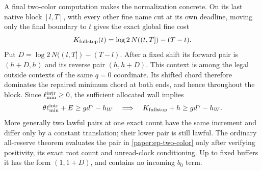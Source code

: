 A final two-color computation makes the normalization concrete.
On its last native block $[l,T]$, with every other fine name cut at
its own deadline, moving only the final boundary to $t$ gives the
exact global fine cost
\begin{equation}\label{paper:ep-two-color}
 K_{\rm fullstop}(t)=\log2\,N((t,T])-(T-t).
\end{equation}
Put $D=\log2\,N((l,T])-(T-l)$.  After a fixed shift its forward
pair is $(h+D,h)$ and its reverse pair $(h,h+D)$.
This context is among the legal outside contexts of the same $q=0$
coordinate.  Its shifted chord therefore dominates the repaired
minimum chord at both ends, and hence throughout the block.
Since $\ell_{\min}^{\rm intr}\geq0$, the sufficient allocated wall
implies
\[
 \theta\ell_{\min}^{\rm intr}+E\geq g d^\gamma-h_W
 \quad\Longrightarrow\quad K_{\rm fullstop}+h\geq g d^\gamma-h_W.
\]
More generally two lawful pairs at one exact count have the same
increment and differ only by a constant translation; their lower pair
is still lawful.  The ordinary all-reserve theorem evaluates the pair
in \eqref{paper:ep-two-color} only after verifying positivity, its
exact root count and unread-clock conditioning.  Up to fixed buffers
it has the form $(1,1+D)$, and contains no incoming $b_0$ term.

